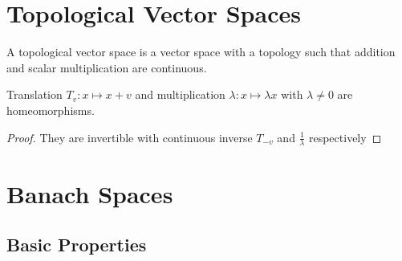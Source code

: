 \documentclass[prb,12pt]{revtex4-2}
\theoremstyle{definition}
\theoremstyle{definition}
\theoremstyle{definition}
\begin{document}
	\section{Topological Vector Spaces}
	\begin{Definition}
		A topological vector space is a vector space with a topology such that addition and scalar multiplication are continuous.
	\end{Definition}
	\begin{Theorem}
		Translation $T_v:x\mapsto x + v$ and multiplication $\lambda: x \mapsto \lambda x$ with $\lambda\neq0$ are homeomorphisms.
	\end{Theorem}
	\begin{proof}
		They are invertible with continuous inverse $T_{-v}$ and $\frac 1\lambda$ respectively
	\end{proof}
	\begin{Definition}
	\end{Definition}
	\begin{Theorem}
	\end{Theorem}
	\begin{Theorem}
	\end{Theorem}
	\begin{Definition}
	\end{Definition}
	\section{Banach Spaces}
	\subsection{Basic Properties}
	\begin{Definition}
	\end{Definition}
	\begin{Definition}[Norm]
	\end{Definition}
	\begin{Definition}[Seminorm]
	\end{Definition}
	\begin{Theorem}
	\end{Theorem}
	\begin{Definition}
	\end{Definition}
	\begin{Corollary}
	\end{Corollary}
	\begin{Theorem}
	\end{Theorem}
	\begin{Theorem}
	\end{Theorem}
	\begin{Definition}
	\end{Definition}
\end{document}
